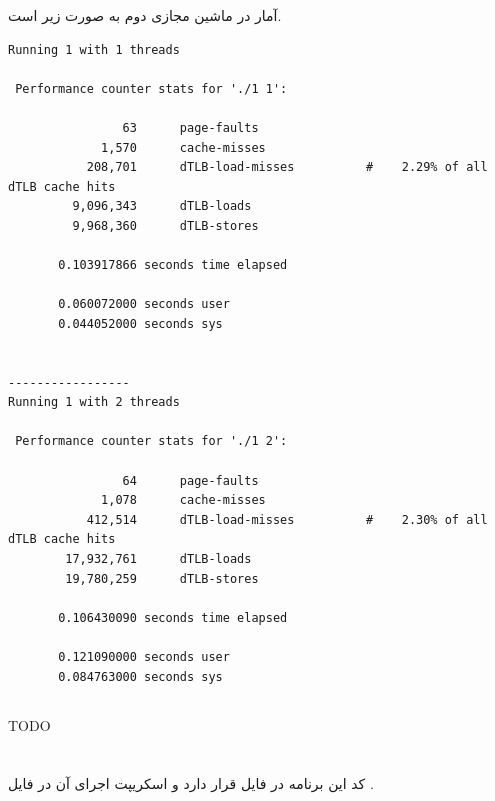 \documentclass{article}
\begin{document}
آمار در ماشین مجازی دوم به صورت زیر است.
\begin{latin}
\begin{lstlisting}
Running 1 with 1 threads

 Performance counter stats for './1 1':

                63      page-faults                                                 
             1,570      cache-misses                                                
           208,701      dTLB-load-misses          #    2.29% of all dTLB cache hits 
         9,096,343      dTLB-loads                                                  
         9,968,360      dTLB-stores                                                 

       0.103917866 seconds time elapsed

       0.060072000 seconds user
       0.044052000 seconds sys


-----------------
Running 1 with 2 threads

 Performance counter stats for './1 2':

                64      page-faults                                                 
             1,078      cache-misses                                                
           412,514      dTLB-load-misses          #    2.30% of all dTLB cache hits 
        17,932,761      dTLB-loads                                                  
        19,780,259      dTLB-stores                                                 

       0.106430090 seconds time elapsed

       0.121090000 seconds user
       0.084763000 seconds sys
\end{lstlisting}
\end{latin}

\subsection{}
TODO

\section{}
کد این برنامه در فایل 
قرار دارد و اسکریپت اجرای آن در فایل 
.
\end{document}
